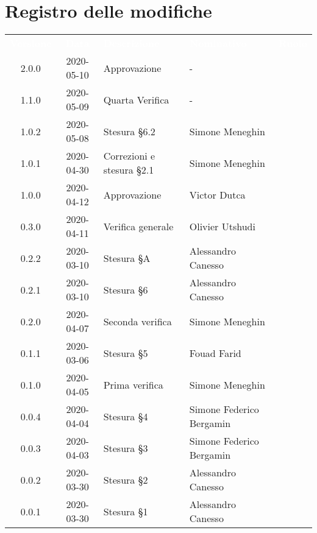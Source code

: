 \section*{Registro delle modifiche}
{
	\centering
	\begin{longtable}{ c c  C{4cm}  C{4cm}  C{3cm} }
		\textcolor{white}{\textbf{Versione}} & \textcolor{white}{\textbf{Data}} & \textcolor{white}{\textbf{Descrizione}} & \textcolor{white}{\textbf{Nominativo}} & \textcolor{white}{\textbf{Ruolo}}\\		
		2.0.0 & 2020-05-10 & Approvazione & - &\RdP{} \\
		1.1.0 & 2020-05-09 & Quarta Verifica & - &\ver{} \\
		1.0.2 & 2020-05-08 & Stesura \S 6.2 & Simone Meneghin &\adm{} \\
		1.0.1 & 2020-04-30 & Correzioni e stesura \S 2.1 & Simone Meneghin &\Res{} \\
		1.0.0 & 2020-04-12 & Approvazione & Victor Dutca &\RdP{} \\
		0.3.0 & 2020-04-11 & Verifica generale & Olivier Utshudi &\ver{} \\
		0.2.2 & 2020-03-10 & Stesura \S A & Alessandro Canesso &\Res{} \\
		0.2.1 & 2020-03-10 & Stesura \S 6 & Alessandro Canesso &\Res{} \\
		0.2.0 & 2020-04-07 & Seconda verifica & Simone Meneghin &\ver{} \\
		0.1.1 & 2020-03-06 & Stesura \S 5  & Fouad Farid &\Res{} \\
		0.1.0 & 2020-04-05 & Prima verifica & Simone Meneghin &\ver{} \\
		0.0.4 & 2020-04-04 & Stesura \S 4  & Simone Federico Bergamin &\adm{}\\	
		0.0.3 & 2020-04-03 & Stesura \S 3  & Simone Federico Bergamin &\adm{}\\	
		0.0.2 & 2020-03-30 & Stesura \S 2  & Alessandro Canesso &\Res{}\\	
		0.0.1 & 2020-03-30 & Stesura \S 1  & Alessandro Canesso &\Res{}\\		
	\end{longtable}
} 
